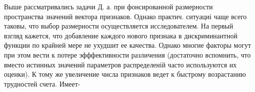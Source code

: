 \documentclass[10pt]{article}
\begin{document}
Выше рассматривались задачи Д. а. при фонсированной размерности пространства значений вектора признаков. Однако практич. ситуациі чаще всего таковы, что выбор размерности осуществляется исследователем. На первый взгляд кажется, что добавление каждого нового признака в дискриминантной функции по крайней мере не ухудшит ее качества. Однако многие факторы могут при этом вести к потере эфффективности различения (достаточно вспомнить, что вместо истинных значений параметров распределеній часто используются их оценки). К тому же увеличение числа признаков ведет к быстрому возрастанию трудностей счета. Имеет-
\end{document}
